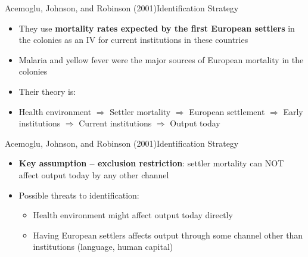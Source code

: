 \documentclass[dvipsnames,hyperref={pdfpagelabels=false}]{beamer}
\begin{document}
\begin{frame}{Acemoglu, Johnson, and Robinson (2001)}{Identification Strategy}
	\begin{itemize}
		\item They use \textbf{mortality rates expected by the first European settlers} in the colonies as an IV for current institutions in these countries
		\vspace{0.2cm}
		\item  Malaria and yellow fever were the major sources of European mortality in the colonies
		\vspace{0.2cm}
		\item Their theory is:
		\vspace{0.2cm}
		\item[] Health environment $\Rightarrow$ Settler mortality $\Rightarrow$ European settlement
		$\Rightarrow$ Early institutions $\Rightarrow$ Current institutions $\Rightarrow$ Output today
		
		
		
	\end{itemize}
\end{frame}


\begin{frame}{Acemoglu, Johnson, and Robinson (2001)}{Identification Strategy}
	\begin{itemize}
		
		\item \textbf{Key assumption -- exclusion restriction}: settler mortality can NOT affect output today by any other channel
		\vspace{0.2cm}
		\item Possible threats to identification:
		\vspace{0.2cm}
		\begin{itemize}
			\item Health environment might affect output today directly
			\vspace{0.2cm}
			\item Having European settlers affects output through some channel other than institutions (language, human capital)
		\end{itemize}
		
		
		
		
	\end{itemize}
\end{frame}
\end{document}
